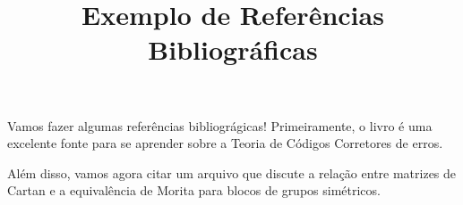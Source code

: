 \documentclass[12pt, a4paper]{article}
\title{Exemplo de Referências Bibliográficas}
\author{}
\date{}
\begin{document}
  \maketitle

  Vamos fazer algumas referências bibliográgicas! Primeiramente, o livro \cite{macwilliams} é uma excelente fonte para se aprender sobre a Teoria de Códigos Corretores de erros.

  Além disso, vamos agora citar um arquivo que discute a relação entre matrizes de Cartan e a equivalência de Morita para blocos de grupos simétricos\cite{cartan_mat}.

  
  
\end{document}

